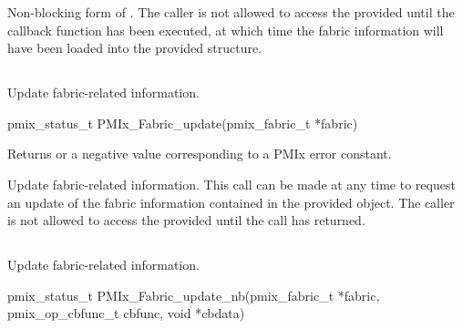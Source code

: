 \descr

Non-blocking form of . The caller is not allowed to access the provided  until the callback function has been executed, at which time the fabric information will have been loaded into the provided structure.

\subsection{}

\summary

Update fabric-related information.

\format

\cspecificstart
\begin{codepar}
pmix_status_t
PMIx_Fabric_update(pmix_fabric_t *fabric)
\end{codepar}
\cspecificend

\begin{arglist}
\end{arglist}

Returns  or a negative value corresponding to a \ac{PMIx} error constant.

\descr

Update fabric-related information. This call can be made at any time to request an update of the fabric information contained in the provided  object. The caller is not allowed to access the provided  until the call has returned.


\subsection{}

\summary

Update fabric-related information.

\format

\cspecificstart
\begin{codepar}
pmix_status_t
PMIx_Fabric_update_nb(pmix_fabric_t *fabric,
                      pmix_op_cbfunc_t cbfunc, void *cbdata)
\end{codepar}
\cspecificend


